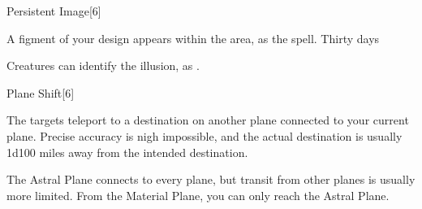 \begin{spellsection}{Persistent Image}[6]
    \begin{spellheader}
    \end{spellheader}
    \begin{spellcontent}
        \begin{spelltargetinginfo}
        \end{spelltargetinginfo}
        \begin{spelleffects}
            \spelleffect A figment of your design appears within the area, as the  spell.
            \spelldur Thirty days \dismissable
        \end{spelleffects}
    \end{spellcontent}
    \begin{spellfooter}
        \spellnotes Creatures can identify the illusion, as .
    \end{spellfooter}
    \begin{spellaugments}
    \end{spellaugments}
\end{spellsection}

\begin{spellsection}{Plane Shift}[6]
    \begin{spellheader}
    \end{spellheader}
    \begin{spellcontent}
        \begin{spelltargetinginfo}
        \end{spelltargetinginfo}
        \begin{spelleffects}
            \spelleffect The targets teleport to a destination on another plane connected to your current plane. Precise accuracy is nigh impossible, and the actual destination is usually 1d100 miles away from the intended destination.
        \end{spelleffects}
    \end{spellcontent}
    \begin{spellfooter}
        \spellnotes The Astral Plane connects to every plane, but transit from other planes is usually more limited. From the Material Plane, you can only reach the Astral Plane.
    \end{spellfooter}
\end{spellsection}

